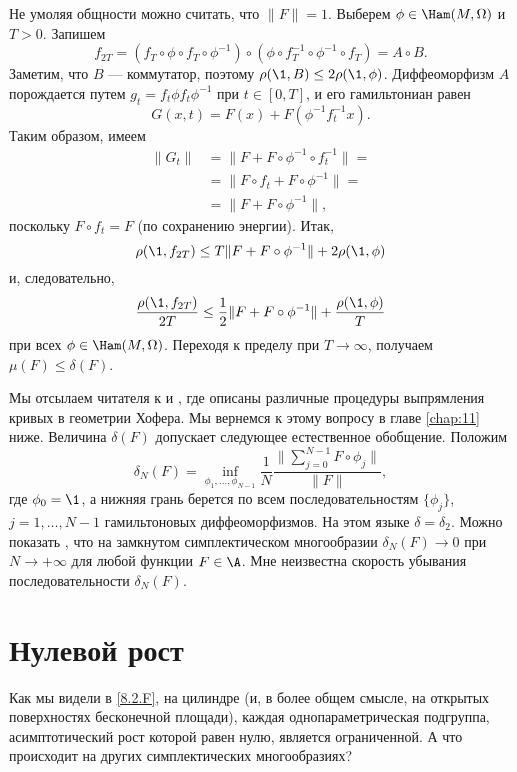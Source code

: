 Не умоляя общности можно считать, что $\|F \| = 1$.
Выберем $\phi \in \Ham (M, \Omega)$ и $T> 0$.
Запишем 
\[f_{2T}= (f_T \circ \phi \circ f_T \circ \phi^{-1}) \circ (\phi \circ f_T^{-1} \circ \phi^{-1} \circ f_T) = A \circ B.\]
Заметим, что $B$ --- коммутатор, поэтому $\rho (\1, B) \le 2\rho (\1, \phi)$.
Диффеоморфизм $A$ порождается путем $g_t = f_t \phi f_t \phi ^{-1}$ при $t \in [0, T]$, и его гамильтониан равен 
\[G (x, t) = F (x) + F (\phi^{-1} f_t^{-1} x).\]
Таким образом, имеем 
\begin{align*}
\|G_t \| &= \|F + F \circ \phi ^{-1} \circ f_t ^{-1} \| =
\\
&=\|F \circ f_t + F \circ \phi ^{-1} \| =
\\
&=\|F + F \circ \phi ^{-1} \|,\end{align*}
поскольку $F \circ f_t = F$ (по сохранению энергии).
Итак, 
\[\rho (\1, f_{2T}) \le T \| F + F \circ \phi ^{-1} \| + 2\rho (\1, \phi)\]
и, следовательно, 
\[\frac{\rho (\1, f_{2T})}{2T}
\le\frac12 \|F + F \circ \phi ^{-1} \| + \frac{\rho (\1, \phi)}{T}\]
при всех $\phi \in \Ham (M , \Omega)$.
Переходя к пределу при $T \to \infty$, получаем $\mu (F) \le \delta (F)$.
\qeds

Мы отсылаем читателя к \cite{LM2} и \cite{P9}, где описаны различные процедуры выпрямления кривых в геометрии Хофера.
Мы вернемся к этому вопросу в главе \ref{chap:11} ниже.
Величина $\delta (F)$ допускает следующее естественное обобщение.
Положим 
\[\delta_N(F)= \inf_{\phi_1 ,\dots, \phi_{N-1}}\frac1N \frac{\|\sum_{j = 0}^{N-1} F \circ \phi_j \|}{\|F \|},\]
где $\phi_0 = \1$, а нижняя грань берется по всем последовательностям $\{\phi_j\}$, $j = 1,\dots, N-1 $ гамильтоновых диффеоморфизмов.
На этом языке $\delta = \delta_2$.
Можно показать \cite{P9}, что на замкнутом симплектическом многообразии $\delta_N (F) \to 0$ при $N \to + \infty$ для любой функции $F \in \A$.
Мне неизвестна скорость убывания последовательности $\delta_N (F)$.

\section{Нулевой рост}

Как мы видели в \ref{8.2.F}, на цилиндре (и, в более общем смысле, на открытых поверхностях бесконечной площади), каждая однопараметрическая подгруппа, асимптотический рост которой равен нулю, является ограниченной.
А что происходит на других симплектических многообразиях?

